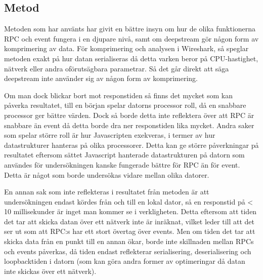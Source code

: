 \subsection{Metod}
\label{subsec:tim-discussion-method}
Metoden som har använts har givit en bättre insyn om hur de olika funktionerna RPC och event fungera i en djupare nivå, samt om deepstream gör någon form av komprimering av data. För komprimering och analysen i Wireshark, så speglar metoden exakt på hur datan serialiseras då detta varken beror på CPU-hastighet, nätverk eller andra oförutsägbara parametrar. Så det går direkt att säga deepstream inte använder sig av någon form av komprimering.

Om man dock blickar bort mot responstiden så finns det mycket som kan påverka resultatet, till en början spelar datorns processor roll, då en snabbare processor ger bättre värden. Dock så borde detta inte reflektera över att RPC är snabbare än event då detta borde dra ner responstiden lika mycket. Andra saker som spelar större roll är hur Javascripten exekveras, i termer av hur datastrukturer hanteras på olika processorer. Detta kan ge större påverkningar på resultatet eftersom sättet Javascript hanterade datastrukturen på datorn som användes för undersökningen kanske fungerade bättre för RPC än för event. Detta är något som borde undersökas vidare mellan olika datorer. 

En annan sak som inte reflekteras i resultatet från metoden är att undersökningen endast kördes från och till en lokal dator, så en responstid på < 10 millisekunder är inget man kommer se i verkligheten. Detta eftersom att tiden det tar att skicka datan över ett nätverk inte är inräknat, vilket leder till att det ser ut som att RPC:s har ett stort övertag över events. Men om tiden det tar att skicka data från en punkt till en annan ökar, borde inte skillnaden mellan RPCs och events påverkas, då tiden endast reflekterar serialisering, deserialisering och loopbacktiden i datorn (som kan göra andra former av optimeringar då datan inte skickas över ett nätverk).
